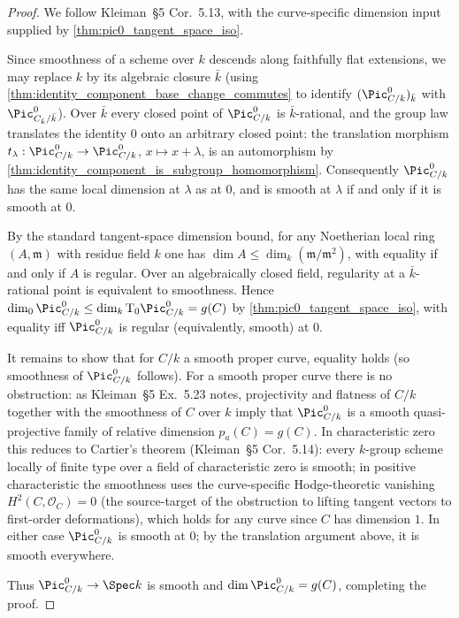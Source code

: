 \begin{proof}
  We follow Kleiman~\S 5 Cor.~5.13, with the curve-specific dimension
  input supplied by \cref{thm:pic0_tangent_space_iso}.

  Since smoothness of a scheme over \(k\) descends along faithfully
  flat extensions, we may replace \(k\) by its algebraic closure
  \(\bar k\) (using \cref{thm:identity_component_base_change_commutes}
  to identify \((\Pic^0_{C/k})_{\bar k}\) with \(\Pic^0_{C_{\bar k}/\bar k}\)).
  Over \(\bar k\) every closed point of \(\Pic^0_{C/k}\) is
  \(\bar k\)-rational, and the group law translates the identity \(0\)
  onto an arbitrary closed point: the translation morphism
  \(t_\lambda : \Pic^0_{C/k} \to \Pic^0_{C/k}\), \(x \mapsto x +
  \lambda\), is an automorphism by
  \cref{thm:identity_component_is_subgroup_homomorphism}. Consequently
  \(\Pic^0_{C/k}\) has the same local dimension at \(\lambda\) as at
  \(0\), and is smooth at \(\lambda\) if and only if it is smooth at
  \(0\).

  By the standard tangent-space dimension bound, for any Noetherian
  local ring \((A, \mathfrak{m})\) with residue field \(k\) one has
  \(\dim A \le \dim_k (\mathfrak{m}/\mathfrak{m}^2)\), with equality
  if and only if \(A\) is regular. Over an algebraically closed field,
  regularity at a \(\bar k\)-rational point is equivalent to
  smoothness. Hence
  \(
    \dim_0 \Pic^0_{C/k} \le \dim_k \tu T_0 \Pic^0_{C/k} = g(C)
  \)
  by \cref{thm:pic0_tangent_space_iso}, with equality iff
  \(\Pic^0_{C/k}\) is regular (equivalently, smooth) at \(0\).

  It remains to show that for \(C/k\) a smooth proper curve, equality
  holds (so smoothness of \(\Pic^0_{C/k}\) follows). For a smooth
  proper curve there is no obstruction: as Kleiman~\S 5 Ex.~5.23
  notes, projectivity and flatness of \(C/k\) together with the
  smoothness of \(C\) over \(k\) imply that \(\Pic^0_{C/k}\) is a
  smooth quasi-projective family of relative dimension \(p_a(C) =
  g(C)\). In characteristic zero this reduces to Cartier's theorem
  (Kleiman~\S 5 Cor.~5.14): every \(k\)-group scheme locally of
  finite type over a field of characteristic zero is smooth; in
  positive characteristic the smoothness uses the curve-specific
  Hodge-theoretic vanishing
  \(H^2(C, \mathcal{O}_C) = 0\) (the source-target of the obstruction
  to lifting tangent vectors to first-order deformations), which holds
  for any curve since \(C\) has dimension \(1\). In either case
  \(\Pic^0_{C/k}\) is smooth at \(0\); by the translation argument
  above, it is smooth everywhere.

  Thus \(\Pic^0_{C/k} \to \Spec k\) is smooth and
  \(\dim \Pic^0_{C/k} = g(C)\), completing the proof.
\end{proof}

